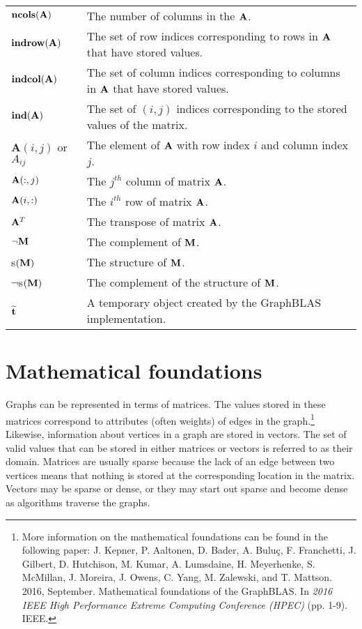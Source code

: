 \begin{tabular}[H]{l|p{5in}}
$\mathbf{ncols}({\bf A})$ & The number of columns in the ${\bf A}$.\\
$\mathbf{indrow}({\bf A})$ & The set of row indices corresponding to rows in ${\bf A}$ that have stored values.  \\
$\mathbf{indcol}({\bf A})$ & The set of column indices corresponding to columns in ${\bf A}$ that have stored values. \\
$\mathbf{ind}({\bf A})$ & The set of $(i,j)$ indices corresponding to the stored values of the matrix. \\
$\mathbf{A}(i,j)$ or $A_{ij}$ & The element of ${\bf A}$ with row index $i$ and column index $j$.\\
${\bf A}(:,j)$ & The $j^{th}$ column of matrix ${\bf A}$.\\
${\bf A}(i,:)$ & The $i^{th}$ row of matrix ${\bf A}$.\\
${\bf A}^T$ &The transpose of matrix ${\bf A}$. \\
$\neg{\bf M}$ & The complement of ${\bf M}$.\\
s$({\bf M})$ & The structure of ${\bf M}$.\\
$\neg$s$({\bf M})$ & The complement of the structure of ${\bf M}$.\\
${\bf \widetilde{t}}$ & A temporary object created  by the GraphBLAS implementation. \\
\end{tabular}

\restoregeometry


\section{Mathematical foundations}

Graphs can be represented in terms of matrices. The values stored in these 
matrices correspond to attributes (often weights) of edges in the graph.\footnote{More information on the mathematical foundations can be found in the following paper: J. Kepner, P. Aaltonen, D. Bader,  A. Buluç, F. Franchetti, J. Gilbert, D. Hutchison, M. Kumar, A. Lumsdaine, H. Meyerhenke, S. McMillan, J. Moreira, J. Owens, C. Yang, M. Zalewski, and T. Mattson. 2016, September. Mathematical foundations of the GraphBLAS. In \emph{2016 IEEE High Performance Extreme Computing Conference (HPEC)} (pp. 1-9). IEEE.} 
Likewise, information about vertices in a graph are stored in vectors.
The set of valid values that can be stored in either matrices or vectors
is referred to as their domain. Matrices are usually sparse because the 
lack of an edge between two vertices means that nothing is stored at the 
corresponding location in the matrix.  Vectors may be sparse or dense, or they may 
start out sparse and become dense as algorithms traverse the graphs.

